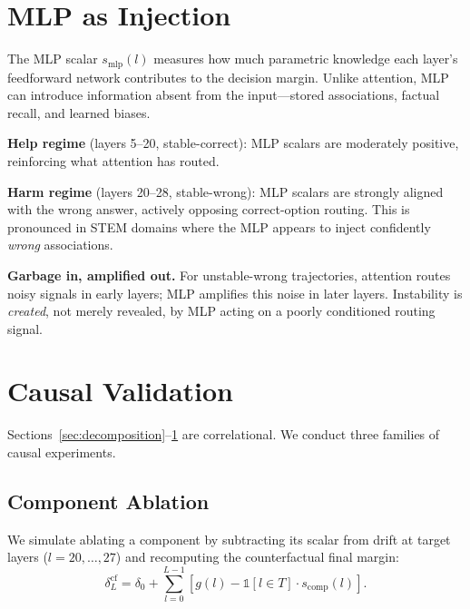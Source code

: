 \documentclass{article}
\begin{document}
\FloatBarrier

\section{MLP as Injection}
\label{sec:mlp}

The MLP scalar $s_{\mathrm{mlp}}(l)$ measures how much parametric knowledge each layer's feedforward network contributes to the decision margin.  Unlike attention, MLP can introduce information absent from the input---stored associations, factual recall, and learned biases.

\textbf{Help regime} (layers 5--20, stable-correct): MLP scalars are moderately positive, reinforcing what attention has routed.

\textbf{Harm regime} (layers 20--28, stable-wrong): MLP scalars are strongly aligned with the wrong answer, actively opposing correct-option routing.  This is pronounced in STEM domains where the MLP appears to inject confidently \emph{wrong} associations.

\textbf{Garbage in, amplified out.}  For unstable-wrong trajectories, attention routes noisy signals in early layers; MLP amplifies this noise in later layers.  Instability is \emph{created}, not merely revealed, by MLP acting on a poorly conditioned routing signal.


\section{Causal Validation}
\label{sec:causal}

Sections~\ref{sec:decomposition}--\ref{sec:mlp} are correlational.  We conduct three families of causal experiments.

\subsection{Component Ablation}

We simulate ablating a component by subtracting its scalar from drift at target layers ($l = 20,\ldots,27$) and recomputing the counterfactual final margin:
\begin{equation}
  \delta^{\mathrm{cf}}_L = \delta_0 + \sum_{l=0}^{L-1}\! \left[g(l) - \mathbb{1}[l \in T]\cdot s_{\mathrm{comp}}(l)\right]\!.
  \label{eq:ablation}
\end{equation}
\end{document}
